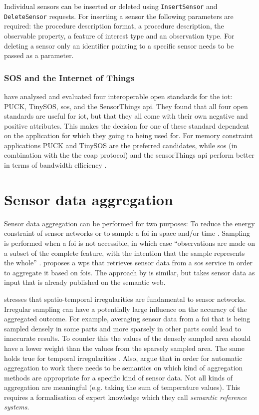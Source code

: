 Individual sensors can be inserted or deleted using \texttt{InsertSensor} and \texttt{DeleteSensor} requests. For inserting a sensor the following parameters are required: the procedure description format, a procedure description, the observable property, a feature of interest type and an observation type. For deleting a sensor only an identifier pointing to a specific sensor needs to be passed as a parameter.

\subsubsection{SOS and the Internet of Things}
\cite{IOT:Jazayeri} have analysed and evaluated four interoperable open standards for the \ac{iot}: PUCK, TinySOS, \ac{sos}, and the SensorThings \ac{api}. They found that all four open standards are useful for \ac{iot}, but that they all come with their own negative and positive attributes. This makes the decision for one of these standard dependent on the application for which they going to being used for. For memory constraint applications PUCK and TinySOS are the preferred candidates, while \ac{sos} (in combination with the the coap protocol) and the sensorThings \ac{api} perform better in terms of bandwidth efficiency \citep{IOT:Jazayeri}. 

\section{Sensor data aggregation}
\label{par:agg}
Sensor data aggregation can be performed for two purposes: To reduce the energy constraint of sensor networks \citep{SW:Korteweg} or to sample a \ac{foi} in space and/or time \citep{SDI:INSPIRE2}. Sampling is performed when a \ac{foi} is not accessible, in which case \enquote{observations are made on a subset of the complete feature, with the intention that the sample represents the whole} \citep{SSW:Cox3}. \cite{SSW:Stasch3} proposes a \ac{wps} that retrieves sensor data from a \ac{sos} service in order to aggregate it based on \acp{foi}. The approach by \cite{SSW:Stasch} is similar, but takes sensor data as input that is already published on the semantic web.

\cite{SW:Ganesan} stresses that spatio-temporal irregularities are fundamental to sensor networks. Irregular sampling can have a potentially large influence on the accuracy of the aggregated outcome. For example, averaging sensor data from a \ac{foi} that is being sampled densely in some parts and more sparsely in other parts could lead to inaccurate results. To counter this the values of the densely sampled area should have a lower weight than the values from the sparsely sampled area. The same holds true for temporal irregularities \citep{SW:Ganesan}. Also, \cite{SSW:Stasch4} argue that in order for automatic aggregation to work there needs to be semantics on which kind of aggregation methods are appropriate for a specific kind of sensor data. Not all kinds of aggregation are meaningful (e.g. taking the sum of temperature values). This requires a formalisation of expert knowledge which they call \textit{semantic reference systems}.


